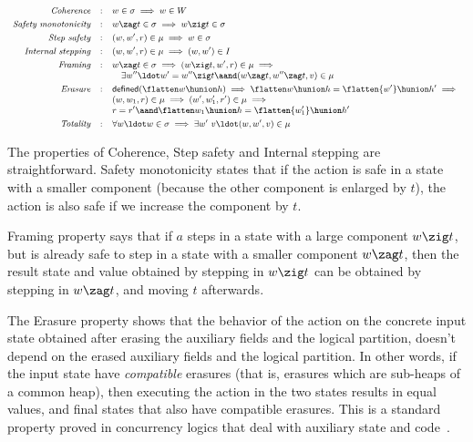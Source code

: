 \[
{\small
\begin{array}{rcl}
\textit{Coherence} & : & w \in \sigma \implies w \in {W}\\[3pt]
\textit{Safety monotonicity} & : & w \zag t \in \sigma \implies w \zig t \in \sigma\\[3pt]
\textit{Step safety} & : & (w, w', r) \in \mu \implies w \in \sigma\\[3pt]
\textit{Internal stepping} & : & (w, w', r) \in \mu \implies (w, w') \in I\\[3pt]
%
\textit{Framing} & : & w \zag t \in \sigma \implies (w \zig t, w', r) \in \mu \implies \hbox{}\\
& & \quad \exists w''\ldot w' = w'' \zig t \aand  (w \zag t, w'' \zag
t, v) \in \mu
\\[3pt]
\textit{Erasure} & : &  \mathsf{defined} (\flatten w \hunion h) \implies \flatten w \hunion h = \flatten{w'} \hunion h' \implies \hbox{}\\
& &  (w, w_1, r) \in \mu \implies (w', w'_1, r') \in \mu \implies \hbox{}\\
& &  r = r' \aand \flatten w_1 \hunion h = \flatten{w'_1} \hunion h'
\\[3pt]
\textit{Totality} & : & \forall w\ldot w \in \sigma \implies \exists w'\ v\ldot (w, w', v) \in \mu
\end{array}
}
\]

The properties of Coherence, Step safety and Internal stepping are
straightforward.  
%
Safety monotonicity states that if the action is safe in a state with
a smaller \self component (because the other component is enlarged by
$t$), the action is also safe if we increase the \self component by
$t$.
%

Framing property says that if $a$ steps in a state with a large \self
component $w \zig t$, but is already safe to step in a state with a
smaller \self component $w \zag t$, then the result state and value
obtained by stepping in $w \zig t$ can be obtained by stepping in $w
\zag t$, and moving $t$ afterwards.

The Erasure property shows that the behavior of the action on the
concrete input state obtained after erasing the auxiliary fields and
the logical partition, doesn't depend on the erased auxiliary fields
and the logical partition. In other words, if the input state have
\emph{compatible} erasures (that is, erasures which are sub-heaps of a
common heap), then executing the action in the two states results in
equal values, and final states that also have compatible
erasures. This is a standard property proved in concurrency logics
that deal with auxiliary state and
code~\cite{Owicki-Gries:CACM76,Brookes:TCS07}.

